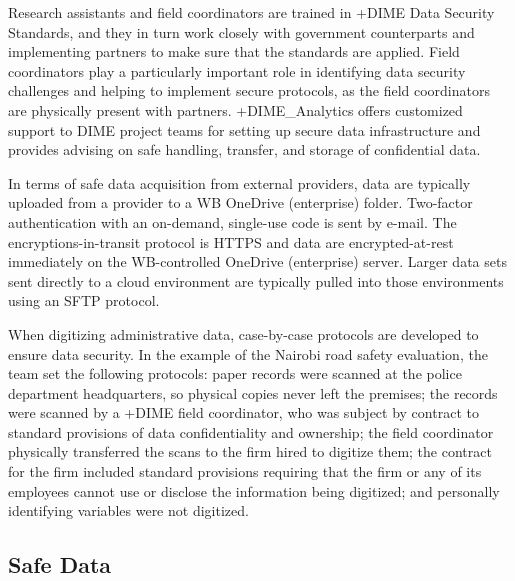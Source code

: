 \documentclass[
]{book}
\begin{document}
Research assistants and field coordinators are trained in +DIME\textbar{} Data Security Standards, and they in turn work closely with government counterparts and implementing partners to make sure that the standards are applied. Field coordinators play a particularly important role in identifying data security challenges and helping to implement secure protocols, as the field coordinators are physically present with partners. +DIME\_Analytics\textbar{} offers customized support to DIME project teams for setting up secure data infrastructure and provides advising on safe handling, transfer, and storage of confidential data.

In terms of safe data acquisition from external providers, data are typically uploaded from a provider to a WB OneDrive (enterprise) folder. Two-factor authentication with an on-demand, single-use code is sent by e-mail. The encryptions-in-transit protocol is HTTPS and data are encrypted-at-rest immediately on the WB-controlled OneDrive (enterprise) server. Larger data sets sent directly to a cloud environment are typically pulled into those environments using an SFTP protocol.

When digitizing administrative data, case-by-case protocols are developed to ensure data security. In the example of the Nairobi road safety evaluation, the team set the following protocols: paper records were scanned at the police department headquarters, so physical copies never left the premises; the records were scanned by a +DIME\textbar{} field coordinator, who was subject by contract to standard provisions of data confidentiality and ownership; the field coordinator physically transferred the scans to the firm hired to digitize them; the contract for the firm included standard provisions requiring that the firm or any of its employees cannot use or disclose the information being digitized; and personally identifying variables were not digitized.

\hypertarget{safe-data-7}{%
\subsection{Safe Data}\label{safe-data-7}}
\end{document}
